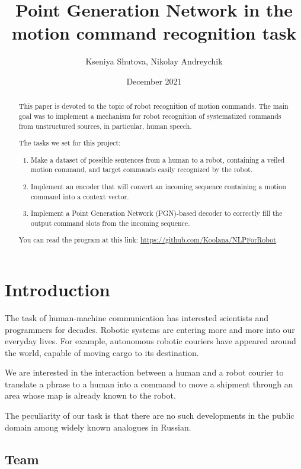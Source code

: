\documentclass{article}
\title{Point Generation Network in the motion command recognition task}
\author{Kseniya Shutova, Nikolay Andreychik}
\date{December 2021}
\begin{document}
\maketitle
\begin{abstract}

    This paper is devoted to the topic of robot recognition of motion commands. The main goal was to implement a mechanism for robot recognition of systematized commands from unstructured sources, in particular, human speech.
    
    The tasks we set for this project:
    
    \begin{enumerate}
      \item Make a dataset of possible sentences from a human to a robot, containing a veiled motion command, and target commands easily recognized by the robot.
      \item Implement an encoder that will convert an incoming sequence containing a motion command into a context vector.
      \item Implement a Point Generation Network (PGN)-based decoder to correctly fill the output command slots from the incoming sequence.
    \end{enumerate}

    You can read the program at this link: \url{https://github.com/Koolana/NLPForRobot}.
\end{abstract}


\section{Introduction}
The task of human-machine communication has interested scientists and programmers for decades. Robotic systems are entering more and more into our everyday lives. For example, autonomous robotic couriers have appeared around the world, capable of moving cargo to its destination.

We are interested in the interaction between a human and a robot courier to translate a phrase to a human into a command to move a shipment through an area whose map is already known to the robot.

The peculiarity of our task is that there are no such developments in the public domain among widely known analogues in Russian.

\subsection{Team}
\end{document}
